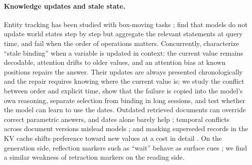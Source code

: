 \documentclass[11pt]{article}
\begin{document}
\paragraph{Knowledge updates and stale state.}
Entity tracking has been studied with box-moving tasks \citep{kim2023entity}; \citet{tang2026entities} find that models do not update world states step by step but aggregate the relevant statements at query time, and fail when the order of operations matters.
Concurrently, \citet{guo2026context} characterize ``stale binding'' when a variable is updated in context: the current value remains decodable, attention drifts to older values, and an attention bias at known positions repairs the answer. Their updates are always presented chronologically and the repair requires knowing where the current value is; we study the conflict between order and explicit time, show that the failure is copied into the model's own reasoning, separate selection from binding in long sessions, and test whether the model can learn to use the dates.
Outdated retrieved documents can override correct parametric answers, and dates alone barely help \citep{ahmed2026stale}; temporal conflicts across document versions mislead models \citep{ozer2025temporal}; and masking superseded records in the KV cache shifts preference toward new values at a cost in detail \citep{zhou2026positions}.
On the generation side, reflection markers such as ``wait'' behave as surface cues \citep{yu2026markers}; we find a similar weakness of retraction markers on the reading side.
\end{document}
